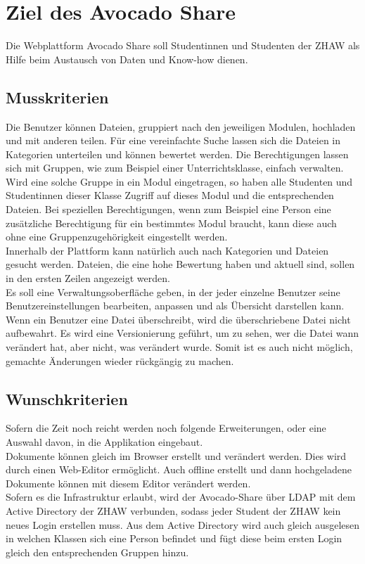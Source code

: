 \section{Ziel des Avocado Share}
Die Webplattform Avocado Share soll Studentinnen und Studenten der ZHAW als Hilfe beim Austausch von Daten und Know-how dienen.
\subsection{Musskriterien}
Die Benutzer können Dateien, gruppiert nach den jeweiligen Modulen, hochladen und mit anderen teilen. Für eine vereinfachte Suche lassen sich die Dateien in Kategorien unterteilen und können bewertet werden. Die Berechtigungen lassen sich mit Gruppen, wie zum Beispiel einer Unterrichtsklasse, einfach verwalten. Wird eine solche Gruppe in ein Modul eingetragen, so haben alle Studenten und Studentinnen dieser Klasse Zugriff auf dieses Modul und die entsprechenden Dateien. Bei speziellen Berechtigungen, wenn zum Beispiel eine Person eine zusätzliche Berechtigung für ein bestimmtes Modul braucht, kann diese auch ohne eine Gruppenzugehörigkeit eingestellt werden.\\

Innerhalb der Plattform kann natürlich auch nach Kategorien und Dateien gesucht werden. Dateien, die eine hohe Bewertung haben und aktuell sind, sollen in den ersten Zeilen angezeigt werden. \\
Es soll eine Verwaltungsoberfläche geben, in der jeder einzelne Benutzer seine Benutzereinstellungen bearbeiten, anpassen und als Übersicht darstellen kann. \\
Wenn ein Benutzer eine Datei überschreibt, wird die überschriebene Datei nicht aufbewahrt. Es wird eine Versionierung geführt, um zu sehen, wer die Datei wann verändert hat, aber nicht, was verändert wurde. Somit ist es auch nicht möglich, gemachte Änderungen wieder rückgängig zu machen.
\subsection{Wunschkriterien}
Sofern die Zeit noch reicht werden noch folgende Erweiterungen, oder eine Auswahl davon, in die Applikation eingebaut.\\
Dokumente können gleich im Browser erstellt und verändert werden. Dies wird durch einen Web-Editor ermöglicht. Auch offline erstellt und dann hochgeladene Dokumente können mit diesem Editor verändert werden.\\
Sofern es die Infrastruktur erlaubt, wird der Avocado-Share über LDAP mit dem Active Directory der ZHAW verbunden, sodass jeder Student der ZHAW kein neues Login erstellen muss. Aus dem Active Directory wird auch gleich ausgelesen in welchen Klassen sich eine Person befindet und fügt diese beim ersten Login gleich den entsprechenden Gruppen hinzu.\\
